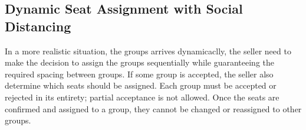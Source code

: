 




\subsection{Dynamic Seat Assignment with Social Distancing}\label{sec_dynamic}
In a more realistic situation, the groups arrives dynamicaclly, the seller need to make the decision to assign the groups sequentially while guaranteeing the required spacing between groups. If some group is accepted, the seller also determine which seats should be assigned. Each group must be accepted or rejected in its entirety; partial acceptance is not allowed. Once the seats are confirmed and assigned to a group, they cannot be changed or reassigned to other groups.


